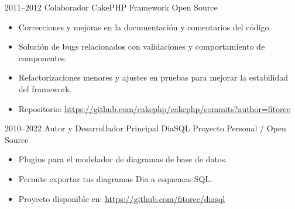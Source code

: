 \cventry
{2011--2012}
{Colaborador}
{CakePHP Framework}
{Open Source}
{}
{
\begin{itemize}
  \item Correcciones y mejoras en la documentación y comentarios del código.
  \item Solución de bugs relacionados con validaciones y comportamiento de componentes.
  \item Refactorizaciones menores y ajustes en pruebas para mejorar la estabilidad del framework.
  \item Repositorio: \url{https://github.com/cakephp/cakephp/commits?author=fitorec}
\end{itemize}
}


\cventry
{2010--2022}
{Autor y Desarrollador Principal}
{DiaSQL}
{Proyecto Personal / Open Source}
{}
{
\begin{itemize}
  \item Plugins para el modelador de diagramas de base de datos.
  \item Permite exportar tus diagramas Dia a esquemas SQL.
  \item Proyecto disponible en:
  \url{https://github.com/fitorec/diasql}
\end{itemize}
}
